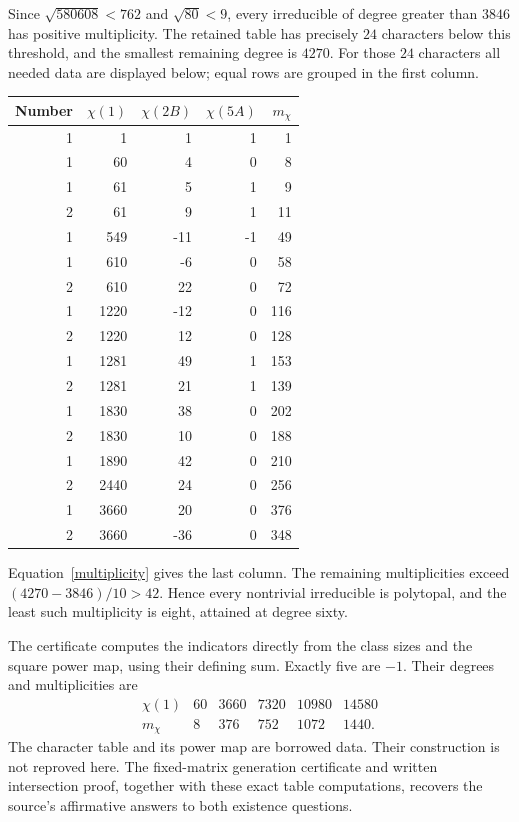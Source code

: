 \documentclass[11pt,a4paper]{article}
\begin{document}
Since $\sqrt{580608}<762$ and $\sqrt{80}<9$, every irreducible
of degree greater than $3846$ has positive multiplicity. The retained
table has precisely $24$ characters below this threshold, and the
smallest remaining degree is $4270$. For those $24$ characters all
needed data are displayed below; equal rows are grouped in the first
column.
\begin{center}
\begin{tabular}{rrrrr}\toprule
Number&$\chi(1)$&$\chi(2B)$&$\chi(5A)$&$m_\chi$\\\midrule
1&1&1&1&1\\1&60&4&0&8\\1&61&5&1&9\\2&61&9&1&11\\
1&549&-11&-1&49\\1&610&-6&0&58\\2&610&22&0&72\\
1&1220&-12&0&116\\2&1220&12&0&128\\
1&1281&49&1&153\\2&1281&21&1&139\\
1&1830&38&0&202\\2&1830&10&0&188\\
1&1890&42&0&210\\2&2440&24&0&256\\
1&3660&20&0&376\\2&3660&-36&0&348\\\bottomrule
\end{tabular}
\end{center}
Equation~\eqref{multiplicity} gives the last column. The remaining
multiplicities exceed $(4270-3846)/10>42$. Hence every nontrivial
irreducible is polytopal, and the least such multiplicity is eight,
attained at degree sixty.

The certificate computes the indicators directly from the class sizes
and the square power map, using their defining sum. Exactly five are
$-1$. Their degrees and multiplicities are
\[
\begin{array}{c|rrrrr}
\chi(1)&60&3660&7320&10980&14580\\\hline
m_\chi&8&376&752&1072&1440.
\end{array}
\]
The character table and its power map are borrowed data. Their
construction is not reproved here. The fixed-matrix generation certificate and written intersection proof,
together with these exact table computations,
recovers the source's affirmative answers to both existence questions.
\end{document}
